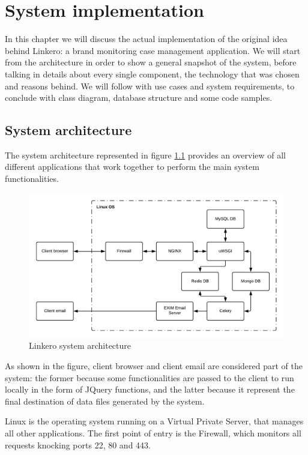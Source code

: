 \chapter{System implementation}

In this chapter we will discuss the actual implementation of the original idea
behind Linkero: a brand monitoring case management application. We will start
from the architecture in order to show a general snapshot of the system, before
talking in details about every single component, the technology that was
chosen and reasons behind. We will follow with use cases and
system requirements, to conclude with class diagram, database structure and some
code samples.

\section{System architecture}
The system architecture represented in figure \ref{fig:sysarch} provides an
overview of all different applications that work together to perform the main
system functionalities.

\begin{figure}[h!]
\centering
\includegraphics[scale=0.7]{imgs/SystemArchitecture.pdf}
\caption{Linkero system architecture}
\label{fig:sysarch}
\end{figure}

As shown in the figure, client browser and client email are considered part of
the system: the former because some functionalities are passed to the client to
run locally in the form of JQuery functions, and the latter because it represent
the final destination of data files generated by the system.

Linux is the operating system running on a Virtual Private Server, that manages
all other applications. The first point of entry is the Firewall, which monitors
all requests knocking ports 22, 80 and 443.

